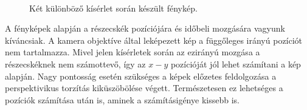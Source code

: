 	\begin{figure}[!ht]
		\centering
		\\
		\caption{Két különböző kísérlet során készült fénykép.}
		\label{fig:captures}
	\end{figure}
	
	A fényképek alapján a részecskék pozíciójára és időbeli {\color{red}mozgására} vagyunk kíváncsiak.
	A kamera objektíve által leképezett kép a függőleges irányú pozíciót nem tartalmazza. Mivel jelen
	kísérletek során az ezirányú mozgása a részecskéknek nem számottevő, így az $x-y$ pozícióját jól
	lehet számítani a kép alapján. Nagy pontosság esetén szükséges a képek előzetes feldolgozása a
	perspektivikus torzítás kiküszöbölése végett. Természetesen ez lehetséges a pozíciók számítása után
	is, aminek a számításigénye kissebb is.
	



